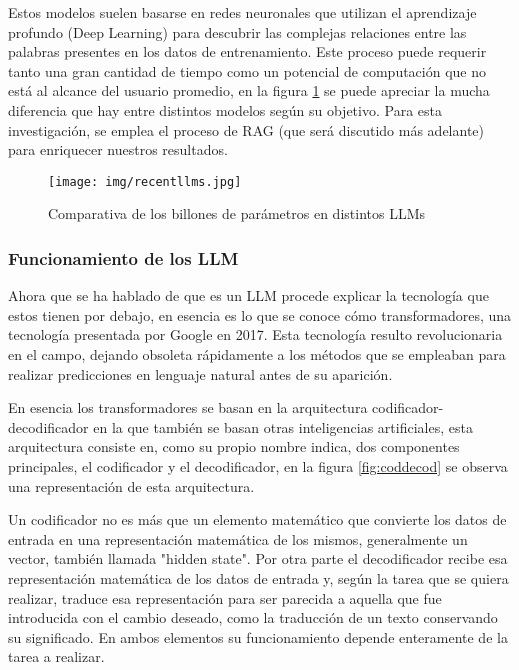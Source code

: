 Estos modelos suelen basarse en redes neuronales que utilizan el aprendizaje profundo (Deep Learning) para descubrir las complejas relaciones entre las palabras presentes en los datos de entrenamiento. Este proceso puede requerir tanto una gran cantidad de tiempo como un potencial de computación que no está al alcance del usuario promedio, en la figura \ref{fig:graficallms} se puede apreciar la mucha diferencia que hay entre distintos modelos según su objetivo. Para esta investigación, se emplea el proceso de RAG (que será discutido más adelante) para enriquecer nuestros resultados.

\begin{figure}[h]
    \centering
    \texttt{[image: img/recentllms.jpg]}
    \caption{Comparativa de los billones de parámetros en distintos LLMs}
    \label{fig:graficallms}
\end{figure}

\subsubsection{Funcionamiento de los LLM}

Ahora que se ha hablado de que es un LLM procede explicar la tecnología que estos tienen por debajo, en esencia es lo que se conoce cómo transformadores, una tecnología presentada por Google en 2017. Esta tecnología resulto revolucionaria en el campo, dejando obsoleta rápidamente a los métodos que se empleaban para realizar predicciones en lenguaje natural antes de su aparición.

En esencia los transformadores se basan en la arquitectura codificador-decodificador en la que también se basan otras inteligencias artificiales, esta arquitectura consiste en, como su propio nombre indica, dos componentes principales, el codificador y el decodificador, en la figura \ref{fig:coddecod} se observa una representación de esta arquitectura. 

Un codificador no es más que un elemento matemático que convierte los datos de entrada en una representación matemática de los mismos, generalmente un vector, también llamada "hidden state". Por otra parte el decodificador recibe esa representación matemática de los datos de entrada y, según la tarea que se quiera realizar, traduce esa representación para ser parecida a aquella que fue introducida con el cambio deseado, como la traducción de un texto conservando su significado. En ambos elementos su funcionamiento depende enteramente de la tarea a realizar.

